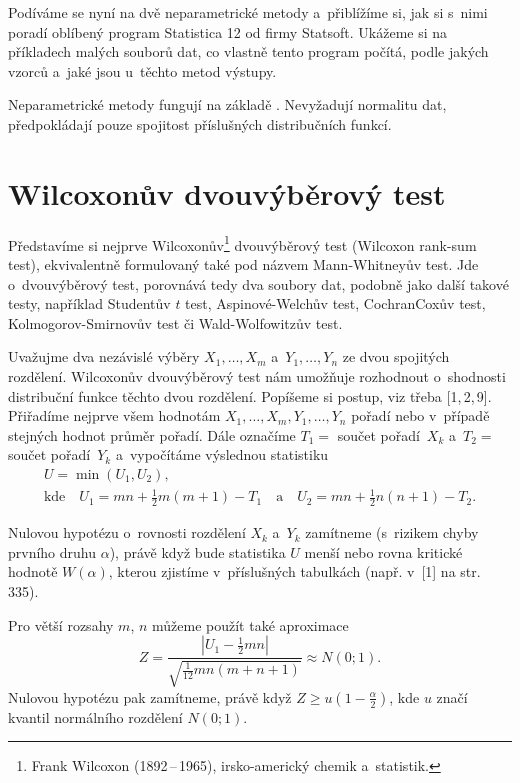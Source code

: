 Podíváme se nyní na dvě neparametrické metody a~přiblížíme si, jak si s~nimi poradí oblíbený program Statistica 12 od firmy Statsoft. Ukážeme si na příkladech malých souborů dat, co vlastně tento program počítá, podle jakých vzorců a~jaké jsou u~těchto metod výstupy.

Neparametrické metody fungují na základě . Nevyžadují normalitu dat, předpokládají pouze spojitost
příslušných distribučních funkcí.

\newpage
\section{Wilcoxonův dvouvýběrový test}

Představíme si nejprve Wilcoxonův\footnote{Frank Wilcoxon (1892\,--\,1965), irsko-americký chemik a~statistik.}
 dvouvýběrový test (Wilcoxon rank-sum test), ekvivalentně formulovaný také pod názvem
Mann-Whitneyův test. Jde o~dvouvýběrový test, porovnává tedy dva soubory dat, podobně jako další takové testy,
například Studentův $t$ test, Aspinové-Welchův test, Cochran\z Coxův test, Kolmogorov-Smirnovův test či Wald-Wolfowitzův test.

Uvažujme dva nezávislé výběry $X_{1},\dots,X_{m}$  a~$Y_{1},\dots,Y_{n}$ ze dvou spojitých rozdělení.
Wilcoxonův dvouvýběrový test nám umožňuje rozhodnout o~shodnosti distribuční funkce těchto dvou rozdělení.
Popíšeme si postup, viz třeba [1,\,2,\,9]. Přiřadíme nejprve všem hodnotám $X_1,\dots, X_m, Y_1,\dots,Y_n$ pořadí nebo v~případě stejných hodnot průměr pořadí. Dále označíme $T_1=$ součet pořadí~$X_k$ a~$T_2=$ součet pořadí~$Y_k$ a~vypočítáme výslednou statistiku
\begin{gather*}
U=\min(U_1,U_2),\\
\mbox{kde} \quad U_1=mn+\frac12m(m+1) -T_1 \quad  \mbox{a} \quad U_2=mn+\frac12n(n+1) -T_2.
\end{gather*}

Nulovou hypotézu o~rovnosti rozdělení $X_k$ a~$Y_k$ zamítneme (s~rizikem chyby prvního druhu $\alpha$), právě když bude statistika
$U$ menší nebo rovna kritické hodnotě $W(\alpha)$, kterou zjistíme v~příslušných tabulkách (např. v~[1] na str. 335).

 Pro větší rozsahy $m$, $n$ můžeme použít také aproximace
$$ Z=\frac{|U_1-\frac12 mn|}{\sqrt{\frac1{12}mn(m+n+1)}}\approx N(0;1) .$$
Nulovou hypotézu pak zamítneme, právě když $  Z\geq u(1-\tfrac{\alpha}2)$,
kde $u$ značí kvantil normálního rozdělení $N(0 ;1)$.

